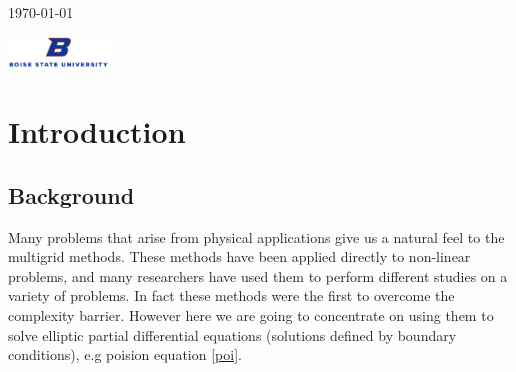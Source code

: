 \documentclass[12pt,a4paper]{article}
\begin{document}
\begin{titlepage}
		
		
		\vfill\vfill\vfill %
		
		{\large\today} %
		
		
		\includegraphics[width=0.2\textwidth]{"Screenshot 2021-03-19 at 10.18.39 PM"}\\[1cm] %

		
		\vfill %
		
	\end{titlepage}
	
	
	\tableofcontents
	\newpage
	\section{Introduction}
	\subsection{Background}
	Many problems that arise from physical applications give us a natural feel to the multigrid methods. These methods  have  been applied directly to non-linear problems, and many researchers have used them to perform different studies on a variety of problems. In fact these methods were the first to overcome the complexity barrier.  However here we are going to concentrate on using them to solve elliptic partial differential equations (solutions defined by boundary conditions), e.g poision equation \eqref{poi}.
	
\end{document}
